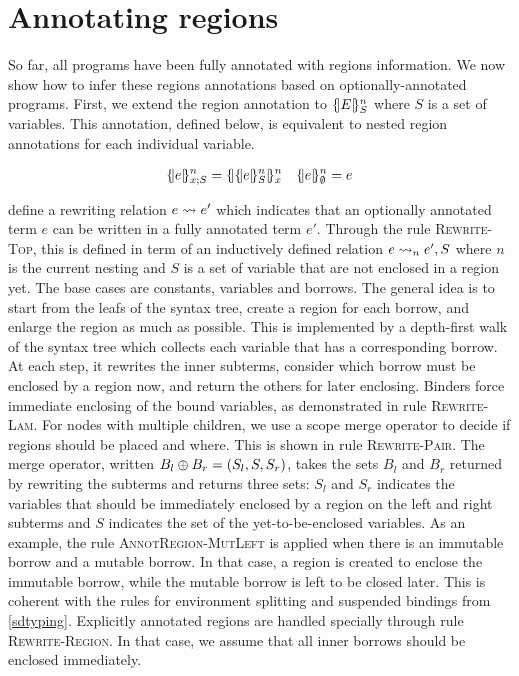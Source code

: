 \section{Annotating regions}
\label{regionannot}

So far, all \lang programs have been fully annotated with regions information.
We now show how to infer these regions annotations based on
optionally-annotated programs.
First, we extend the region annotation to $\region{S}{E}$ where $S$ is
a set of variables. This annotation, defined below, is equivalent to nested
region annotations for each individual variable.

\begin{align*}
  \region{x;S}{e} &= \region{x}{\region{S}{e}}& \region{\emptyset}{e} &= e\\
\end{align*}

 define a rewriting relation $\RannotT{e}{e'}$
which indicates that an optionally annotated term $e$ can be written
in a fully annotated term $e'$.
Through the rule \textsc{Rewrite-Top}, this is defined
in term of an inductively defined relation
$\Rannot{e}{e'}{S}$ where $n$ is the current nesting and $S$ is a set of
variable that are not enclosed in a region yet.
The base cases are constants, variables and borrows.
The general idea is to start from the leafs of the syntax tree, create a
region for each borrow, and enlarge the region as much as possible.
This is implemented by a depth-first walk of the syntax
tree which collects each variable that has a corresponding borrow.
At each step, it rewrites the inner subterms,
consider which borrow must be enclosed by a region now, and
return the others for later enclosing. Binders force immediate
enclosing of the bound variables, as demonstrated in rule \textsc{Rewrite-Lam}.
For nodes with multiple children, we
use a scope merge operator to decide if regions should be placed and where.
This is shown in rule \textsc{Rewrite-Pair}.
The merge operator, written $\getBorrows{B_l}{B_r}{(S_l,S,S_r)}$, takes
the sets $B_l$ and $B_r$ returned by rewriting the subterms
and returns three sets: $S_l$ and $S_r$ indicates the variables
that should be immediately enclosed by a region on the left and right
subterms and $S$ indicates the set of the yet-to-be-enclosed variables.
As an example, the rule \textsc{AnnotRegion-MutLeft} is applied
when there is an immutable borrow and a mutable borrow. In that case, a
region is created to enclose the immutable borrow, while the mutable
borrow is left to be closed later. This is coherent with the rules
for environment splitting and suspended bindings from \cref{sdtyping}.
%
Explicitly annotated regions are handled specially through
rule \textsc{Rewrite-Region}. In that case, we assume that all inner
borrows should be enclosed immediately.

